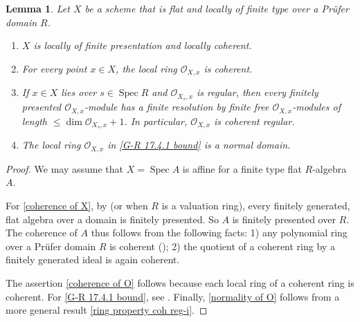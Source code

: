 \documentclass[JEP,XML,SOM,Unicode,published]{cedram}
\newenvironment{enumeratei}
{\bgroup\def\theenumi{\roman{enumi}}\def\theenumii{\arabic{enumii}}\begin{enumerate}}
{\end{enumerate}\egroup}
\newcommand{\sO}{\mathscr{O}}
\DeclareMathOperator{\Spec}{Spec}
\newcommand{\bpf}{\begin{proof}}
\newcommand{\epf}{\end{proof}}
\newcommand{\blem}{\begin{lemma}}
\newcommand{\elem}{\end{lemma}}
\newcommand{\benumr}{\begin{enumeratei}}
\newcommand{\eenumr}{\end{enumeratei}}
\theoremstyle{plain}
\newtheorem{lemma}[subsection]{Lemma}
\theoremstyle{definition}
\begin{document}
\blem\label{coh of V-flat ft alg}
Let $X$ be a scheme that is flat and locally of finite type over a Prüfer domain $R$.
\benumr
\item \label{coherence of X}$X$ is locally of finite presentation and locally coherent.
\item \label{coherence of O}For every point $x\in X$, the local ring $\sO_{X,x}$ is coherent.
\item \label{G-R 17.4.1 bound}If $x\in X$ lies over $s \in \Spec R$ and $\sO_{X_s,x}$ is regular, then every finitely presented $\sO_{X,x}$\nobreakdash-mod\-ule has a finite resolution by finite free $\sO_{X,x}$\nobreakdash-mod\-ules of length $\le \dim \sO_{X_s,x}+1$. In particular, $\sO_{X,x}$ is coherent regular.
\item \label{normality of O} The local ring $\sO_{X,x}$ in \eqref{G-R 17.4.1 bound} is a normal domain.
\eenumr
\elem
\bpf
We may assume that $X=\Spec A$ is affine for a finite type flat $R$\nobreakdash-alge\-bra~$A$.

For \eqref{coherence of X}, by \cite[Cor.\,3.4.7]{RG71} ({or \cite[Th.\,3']{Nag66} when $R$ is a valuation ring}), every finitely generated, flat algebra over a domain is finitely presented.
So $A$ is finitely presented over $R$. The coherence of $A$ thus follows from the following facts: 1) any polynomial ring over a Prüfer domain $R$ is coherent (\cite[Cor.\,7.3.4]{Gla89}); 2) the quotient of a coherent ring by a finitely generated ideal is again coherent.

The assertion \eqref{coherence of O} follows because each local ring of a coherent ring is coherent.
For \eqref{G-R 17.4.1 bound}, see \cite[Prop.\,11.4.1]{GR18}.
Finally, \eqref{normality of O} follows from a more general result \eqref{ring property coh reg-i}.
\epf
\end{document}
